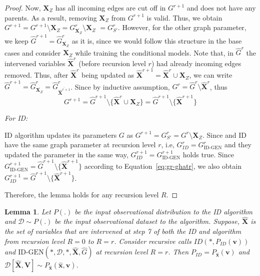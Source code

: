 \documentclass{article}
\newcommand{\X}{\mathbf{X}}
\newcommand{\Xp}{{\hat{\mathbf{X}}}}
\newcommand{\xp}{{\hat{\mathbf{x}}}}
\newcommand{\Gp}{{\hat{{G}}}}
\newcommand{\V}{\mathbf{V}}
\newcommand{\vb}{\mathbf{v}}
\newcommand{\data}{\mathcal{D}}
\newcommand{\idgen}{\text{ID-GEN}\xspace}
\theoremstyle{plain}
\newtheorem{lemma}[theorem]{Lemma}
\theoremstyle{definition}
\theoremstyle{remark}
\begin{document}
\begin{proof}
		Now, $\X_Z$ has all incoming edges are cut off in 
		$G^{r+1}$
		and does not have any parents.
		As a result, removing $\X_Z$ from $G^{r+1}$
		is valid. Thus, we obtain $G^{r+1} = G^{r+1} \setminus {\X_Z} 
		= G^{r}_{\overline{\X_Z}} \setminus {\X_Z} $
		$=G^r_{S'}$.
		However,  for the other graph parameter, we keep $\Gp^{r+1} = \Gp^{r}_{\overline{\X_Z}}$ as it is, since we would follow this structure in the base cases and consider $\X_Z$ while training the conditional models. 
  Note that, in $\Gp^{r}$ the intervened variables $\Xp^r$ (before recursion level $r$) had already incoming edges removed. Thus, after $\Xp^{r}$ being updated as $\Xp^{r+1} = \Xp^r \cup \X_Z$, we can write $\Gp^{r+1} = \Gp^{r}_{\overline{\X_Z}} = \Gp^{r}_{\overline{\Xp^{r+1}}}$.
		Since by inductive assumption, $G^{r} = \Gp^{r} \setminus \Xp^r$, thus
  \begin{equation}
  \label{eq:gr-ghatr}
      G^{r+1} = \Gp^{r+1} \setminus \{\Xp^r\cup \X_Z\}= \Gp^{r+1} \setminus \{\Xp^{r+1}\}
  \end{equation}

    \emph{For ID:}
    
ID algorithm updates its parameters $G$ as 
$G^{r+1} = 
G^r_{S'}=
G^r\setminus \X_Z$.
		Since \idgen and ID have the same graph parameter at recursion level $r$, i.e, $G^{r}_{ID}= G^{r}_{\idgen}$ and they updated the parameter in the same way, $G^{r+1}_{ID}=G^{r+1}_{\idgen}$ holds true.
		Since $G^{r+1}_{\idgen} = \Gp^{r+1} \setminus \{\Xp^{r+1}\}$ according to Equation~\ref{eq:gr-ghatr}, 
  we also obtain $G^{r+1}_{ID} = \Gp^{r+1} \setminus \{\Xp^{r+1}\}$.
		
		Therefore, the lemma holds for any recursion level $R$.
	\end{proof}
	
	
	
	
	\begin{lemma}
		\label{lem:same-dist-dist}
		Let $P(.)$ be the input observational distribution to the ID algorithm and $\data \sim P(.)$ be the input observational dataset to the \idgen algorithm. 
		Suppose, $\Xp$ is the set of variables that are intervened at step 7 of both the ID and \idgen algorithm from recursion level $R=0$ to $R=r$.
		Consider recursive calls  $ID(*, P_{ID}(\vb))$ and  $\idgen(*, \data, *,  \Xp, \Gp )$ at recursion level $R=r$.
		Then $P_{ID} = P_{\xp}(\vb)$ and $\data[\Xp, \V] \sim P_{\xp}(\xp, \vb)$.
	\end{lemma}
	
\end{document}
